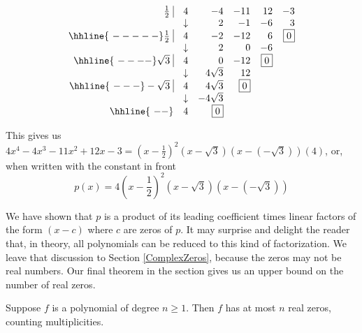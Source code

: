 \[\begin{array}{rrrrrr}
 \frac{1}{2} \, \, \vline& 4 & -4 & -11  & 12 & -3 \\

  & \downarrow &  2  &  -1  & -6 & 3\\ \hhline{~-----} 
  
  \frac{1}{2} \, \, \vline&  4  &   -2  & -12 & 6 &  \fbox{$0$}  \\
    
  & \downarrow &  2  &  0  & -6 &\\ \hhline{~----} 
 
  
 \sqrt{3} \, \, \vline  & 4  &   0  & -12 & \fbox{0} &   \\
  
                        & \downarrow &  4\sqrt{3}  & 12  & &\\ \hhline{~---} 
 
   -\sqrt{3} \, \, \vline  & 4  &  4\sqrt{3}  & \fbox{0} &  &   \\  
       
                          & \downarrow &  -4\sqrt{3}  &   & &\\ \hhline{~--} 
       
													& 4  &  \fbox{0}  &  &  &   \\

\end{array}\]

This gives us $4x^4-4x^3-11x^2+12x-3=\left(x-\frac{1}{2}\right)^2 \left(x-\sqrt{3}\right)\left(x - \left(-\sqrt{3}\right)\right) (4)$, or, when written with the constant in front \[ p(x) = 4\left(x-\frac{1}{2}\right)^2 \left(x-\sqrt{3}\right)\left(x - \left(-\sqrt{3}\right)\right)\]

We have shown that $p$ is a product of its leading coefficient times linear factors of the form $(x-c)$ where $c$ are zeros of $p$. It may surprise and delight the reader that, in theory, all polynomials can be reduced to this kind of factorization.  We leave that discussion to Section \ref{ComplexZeros}, because the zeros may not be real numbers.  Our final theorem in the section gives us an upper bound on the number of real zeros. 

\medskip

\colorbox{ResultColor}{\bbm
\begin{thm}  \label{nzerosreal} Suppose $f$ is a polynomial of degree $n \geq 1$.  Then $f$ has at most $n$ real zeros, counting multiplicities.

\end{thm}
\ebm}

